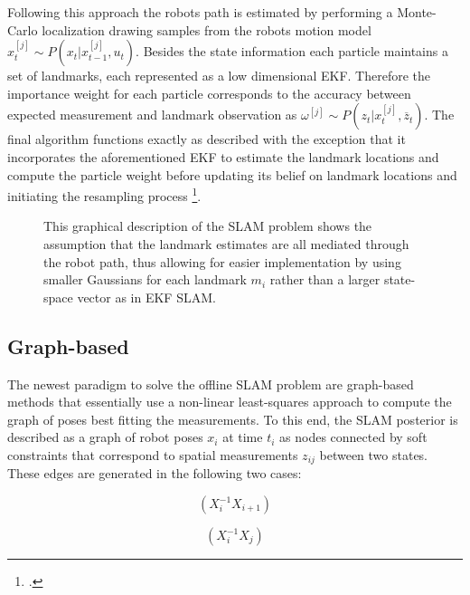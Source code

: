 Following this approach the robots path is estimated by performing a Monte-Carlo localization drawing samples from the robots motion model $x_{t}^{[j]} \sim P(x_{t} | x_{t-1}^{[j]}, u_{t}) $. Besides the state information each particle maintains a set of landmarks, each represented as a low dimensional EKF. Therefore the importance weight for each particle corresponds to the accuracy between expected measurement and landmark observation as $ \omega^{[j]} \sim P(z_{t} | x_{t}^{[j]}, \overline{z}_{t}) $.
The final algorithm functions exactly as described with the exception that it incorporates the aforementioned EKF to estimate the landmark locations and compute the particle weight before updating its belief on landmark locations and initiating the resampling process \footcite[Pages 1159-1162]{stachniss2016simultaneous}. 


\begin{figure}
	\centering
	
	\caption{
		This graphical description of the SLAM problem shows the assumption that the landmark estimates are all mediated through the robot path, thus allowing for easier implementation by using smaller Gaussians for each landmark $m_{i}$ rather than a larger state-space vector as in EKF SLAM.
	}
	\label{fig:fastSlamGraphical}
\end{figure}

\subsection{Graph-based}
The newest paradigm to solve the offline SLAM problem are graph-based methods that essentially use a non-linear least-squares approach to compute the graph of poses best fitting the measurements. 
To this end, the SLAM posterior is described as a graph of robot poses $ x_{i} $ at time $ t_{i} $ as nodes connected by soft constraints that correspond to spatial measurements $z_{ij}$ between two states.
These edges are generated in the following two cases:

\begin{equation}\label{odometryEdge}
	(X_{i}^{-1}X_{i+1})
\end{equation}

\begin{equation}\label{observationEdge}
	(X_{i}^{-1}X_{j})
\end{equation}

